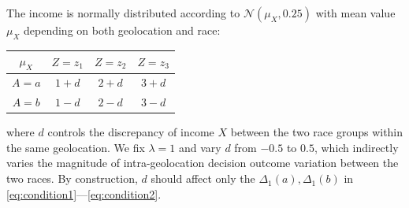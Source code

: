 \begin{experiment}
\label{exp:intra}
The income is normally distributed according to $\mathcal{N}(\mu_X, 0.25)$ with mean value $\mu_X$ depending on both geolocation and race:
\begin{center}
\begin{tabular}{|c||c|c|c|}
\hline
$\mu_{X}$ & $Z=z_{1}$ & $Z=z_{2}$ & $Z=z_{3}$\tabularnewline
\hline
\hline
$A=a$ & $1+d$ & $2+d$ & $3+d$\tabularnewline
\hline
$A=b$ & $1-d$ & $2-d$ & $3-d$\tabularnewline
\hline
\end{tabular}
\end{center}
where $d$ controls the discrepancy of income $X$ between the two race groups within the same geolocation.
We fix $\lambda = 1$ and vary $d$ from $-0.5$ to $0.5$, which indirectly varies the magnitude of intra-geolocation decision outcome variation between the two races.
By construction, $d$ should affect only the $\Delta_1(a), \Delta_1(b)$ in \eqref{eq:condition1}---\eqref{eq:condition2}.
\end{experiment}

